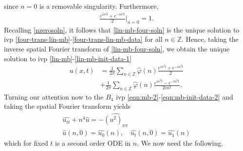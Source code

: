 \documentclass[12pt,reqno]{amsart}
\numberwithin{equation}{section}  %
\newcommand{\zz}{\mathbb{Z}}
\newcommand{\wh}{\widehat}
\newcommand{\vp}{\varphi}
\begin{document}
%
%
since $n=0$ is a removable singularity. Furthermore, 
%
%
\begin{equation*}
\begin{split}
  \frac{e^{in^{2}t} + e^{-in^{2}t}}{2} \Big |_{n = 0} =1.
\end{split}
\end{equation*}
%
%
Recalling \eqref{nzerosoln}, it follows that \eqref{lin-mb-four-soln}
is the unique solution to ivp
\eqref{four-trans-lin-mb}-\eqref{four-trans-lin-mb-data} for all $n \in \zz$.  
Hence, taking the inverse spatial Fourier transform of \eqref{lin-mb-four-soln},
we obtain the unique solution to ivp \eqref{lin-mb}-\eqref{lin-mb-init-data-1}
%
%
\begin{equation*}
\begin{split}
  u(x,t)
  & = \frac{1}{ 2 \pi}
  \sum_{n \in \zz}\wh{\vp}(n) \frac{e^{in^{2}t} + e^{-in^{2}t}}{2}
  \\
  & + \frac{1}{2 \pi} \sum_{n \in \zz}
  \wh{\vp}(n) \frac{e^{in^{2}t} - e^{-in^{2}t}}{2i n^{2}}.
\end{split}\end{equation*}
%
%
%
%
%
Turning our attention now to the $B_{4}$ ivp
\eqref{eqn:mb-2}-\eqref{eqn:mb-init-data-2} and taking the spatial Fourier
transform yields 
%
%
\begin{gather}
  \wh{u_{tt}} + n^{4} \wh{u} = -\wh{(u^{2})_{xx}}
  \label{four-trans-mb}
  \\
  \wh{u}(n, 0) = \wh{u_{0}}(n), \quad \wh{u_{t}}(n, 0) = \wh{u_{1}}(n)
  \label{four-trans-mb-data}
\end{gather}
which for fixed $t$ is a second order ODE in $n$. 
We now need the following.
%
%
%
%
%
%
%
%
\end{document}
